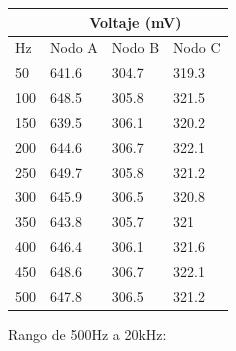 \begin{table}[H]
\centering
\begin{tabular}{l|lll|}
\cline{2-4}
                          & \multicolumn{3}{c|}{Voltaje (mV)}                                  \\ \hline
\multicolumn{1}{|l|}{Hz}  & \multicolumn{1}{c|}{Nodo A} & \multicolumn{1}{l|}{Nodo B} & Nodo C \\ \hline
\multicolumn{1}{|l|}{50} & \multicolumn{1}{l|}{641.6}  & \multicolumn{1}{l|}{304.7}  & 319.3  \\ \hline
\multicolumn{1}{|l|}{100} & \multicolumn{1}{l|}{648.5}  & \multicolumn{1}{l|}{305.8}  & 321.5  \\ \hline
\multicolumn{1}{|l|}{150} & \multicolumn{1}{l|}{639.5}  & \multicolumn{1}{l|}{306.1}  & 320.2  \\ \hline
\multicolumn{1}{|l|}{200} & \multicolumn{1}{l|}{644.6}  & \multicolumn{1}{l|}{306.7}  & 322.1  \\ \hline
\multicolumn{1}{|l|}{250} & \multicolumn{1}{l|}{649.7}  & \multicolumn{1}{l|}{305.8}  & 321.2  \\ \hline
\multicolumn{1}{|l|}{300} & \multicolumn{1}{l|}{645.9}  & \multicolumn{1}{l|}{306.5}  & 320.8  \\ \hline
\multicolumn{1}{|l|}{350} & \multicolumn{1}{l|}{643.8}  & \multicolumn{1}{l|}{305.7}  & 321    \\ \hline
\multicolumn{1}{|l|}{400} & \multicolumn{1}{l|}{646.4}  & \multicolumn{1}{l|}{306.1}  & 321.6  \\ \hline
\multicolumn{1}{|l|}{450} & \multicolumn{1}{l|}{648.6}  & \multicolumn{1}{l|}{306.7}  & 322.1  \\ \hline
\multicolumn{1}{|l|}{500} & \multicolumn{1}{l|}{647.8}  & \multicolumn{1}{l|}{306.5}  & 321.2  \\ \hline
\end{tabular}
\end{table}

Rango de 500Hz a 20kHz:

